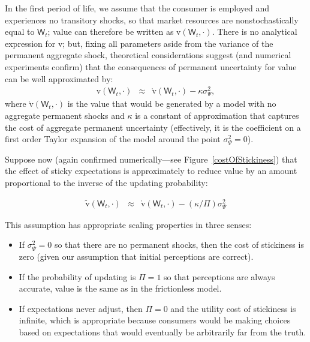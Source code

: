 \documentclass[titlepage]{article}
\begin{document}
In the first period of life, we assume that the consumer is employed and experiences no transitory shocks, so that market resources are nonstochastically equal to $\mathsf{W}_t$; value can therefore be written as $\mathrm{v}(\mathsf{W}_t,\cdot)$.  There is no analytical expression for $\mathrm{v}$; but, fixing all parameters aside from the variance of the permanent aggregate shock, theoretical considerations suggest (and numerical experiments confirm) that the consequences of permanent uncertainty for value can be well approximated by:
\begin{eqnarray*}
   \mathrm{v}(\mathsf{W}_t,\cdot) & \approx & \grave{\mathrm{v}}(\mathsf{W}_t,\cdot) - \kappa \sigma^{2}_{\Psi}, \label{eq:vApprox}
\end{eqnarray*}
  where $\grave{\mathrm{v}}(\mathsf{W}_t,\cdot)$ is the value that would be generated by a model with no aggregate permanent shocks and $\kappa$ is a constant of approximation that captures the cost of aggregate permanent uncertainty (effectively, it is the coefficient on a first order Taylor expansion of the model around the point $\sigma_{\Psi}^{2}=0$).

Suppose now (again confirmed numerically---see Figure~\ref{costOfStickiness}) that the effect of sticky expectations is approximately to reduce value by an amount proportional to the inverse of the updating probability:

\begin{eqnarray}
  \label{eq:vBar}
   \widetilde{\mathrm{v}}(\mathsf{W}_t,\cdot) & \approx & \grave{\mathrm{v}}(\mathsf{W}_t,\cdot)-(\kappa/\Pi)\sigma^{2}_{\Psi} \label{eq:vApproxSticky}
\end{eqnarray}
 
This assumption has appropriate scaling properties in three senses:
\begin{itemize}
\item If $\sigma^{2}_{\Psi}=0$ so that there are no permanent shocks, then
the cost of stickiness is zero (given our assumption that initial perceptions are correct).
\item If the probability of updating is $\Pi=1$ so that perceptions
are always accurate, value is the same as in the frictionless model.
\item If expectations never adjust, then $\Pi=0$ and the utility cost of stickiness is infinite,
which is appropriate because consumers would be making choices based on
expectations that would eventually be arbitrarily far from the truth.
\end{itemize}
\end{document}
